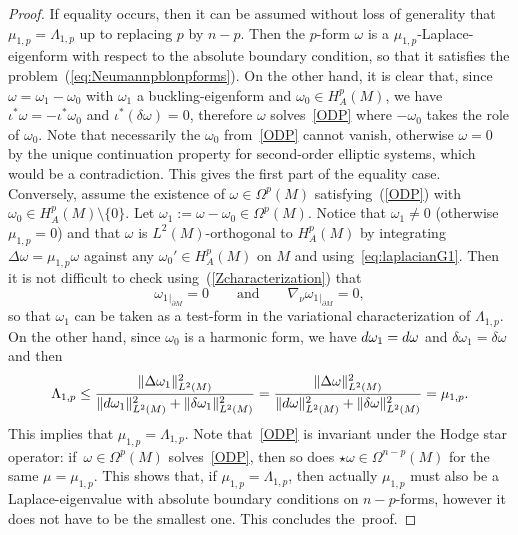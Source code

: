 \documentclass[10pt,a4paper]{amsart}
\begin{document}
\begin{proof}
If equality occurs, then it can be assumed without loss of generality that $\mu_{1,p}=\Lambda_{1,p}$ up to replacing $p$ by $n-p$.
Then the $p$-form $\omega$ is a $\mu_{1,p}$-Laplace-eigenform with respect to the absolute boundary condition, so that it satisfies the problem~(\ref{eq:Neumannpblonpforms}).
On the other hand, it is clear that, since $\omega=\omega_1-\omega_0$
with $\omega_1$ a buckling-eigenform and $\omega_0\in H^p_A(M)$, we have $\iota^*\omega=-\iota^*\omega_0$ and ${\iota^*(\delta\omega)=0}$, therefore $\omega$ solves~\eqref{ODP} where $-\omega_0$ takes the role of $\omega_0$.
Note that necessarily the $\omega_0$ from~\eqref{ODP} cannot vanish, otherwise $\omega=0$ by the unique continuation property for second-order elliptic systems, which would be a contradiction.
This gives the first part of the equality case.
Conversely, assume the existence of $\omega\in\Omega^p(M)$ satisfying~(\ref{ODP}) with $\omega_0\in H^p_A(M)\setminus\{0\}$.
Let $\omega_1:=\omega-\omega_0\in\Omega^p(M)$.
Notice that $\omega_1\neq0$ (otherwise $\mu_{1,p}=0$) and that $\omega$ is $L^2(M)$-orthogonal to $H_A^p(M)$ by integrating $\Delta\omega=\mu_{1,p}\omega$ against any $\omega_0'\in H_A^p(M)$ on $M$ and using~\eqref{eq:laplacianG1}.
Then it is not difficult to check using~(\ref{Zcharacterization}) that
\[
\omega_{1}{}_{|_{\partial M}}=0\qquad\text{and}\qquad\nabla_\nu\omega_{1}{}_{|_{\partial M}}=0,
\]
so that $\omega_1$ can be taken as a test-form in the variational characterization of $\Lambda_{1,p}$.
On the other hand, since $\omega_0$ is a harmonic form, we have ${\rm d}\omega_1={\rm d}\omega$ and $\delta\omega_1=\delta\omega$ and then
\[
\Lambda_{1,p}\leq\frac{\|\Delta\omega_1\|^2_{L^2(M)}}{\|{\rm d}\omega_1\|^2_{L^2(M)}+\|\delta\omega_1\|^2_{L^2(M)}}=\frac{\|\Delta\omega\|^2_{L^2(M)}}{\|{\rm d}\omega\|^2_{L^2(M)}+\|\delta\omega\|^2_{L^2(M)}}=\mu_{1,p}.
\]
This implies that $\mu_{1,p}=\Lambda_{1,p}$.
Note that~\eqref{ODP} is invariant under the Hodge star operator: if~${\omega\in\Omega^p(M)}$ solves~\eqref{ODP}, then so does $\star\omega\in\Omega^{n-p}(M)$ for the same $\mu=\mu_{1,p}$.
This shows that, if $\mu_{1,p}=\Lambda_{1,p}$, then actually $\mu_{1,p}$ must also be a Laplace-eigenvalue with absolute boundary conditions on $n-p$-forms, however it does not have to be the smallest one.
This concludes the~proof.
\end{proof}
\end{document}
